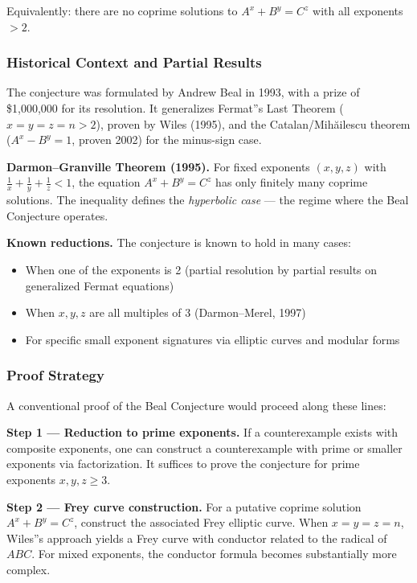 \documentclass[12pt,a4paper]{article}
\begin{document}
\begin{quote}
\end{quote}

Equivalently: there are no coprime solutions to $A^x + B^y = C^z$ with all exponents $> 2$.

\subsubsection{Historical Context and Partial Results}

The conjecture was formulated by Andrew Beal in 1993, with a prize of \$1,000,000 for its resolution. It generalizes Fermat''s Last Theorem ($x = y = z = n > 2$), proven by Wiles (1995), and the Catalan/Mihăilescu theorem ($A^x - B^y = 1$, proven 2002) for the minus-sign case.

\textbf{Darmon--Granville Theorem (1995).} For fixed exponents $(x, y, z)$ with $\frac{1}{x} + \frac{1}{y} + \frac{1}{z} < 1$, the equation $A^x + B^y = C^z$ has only finitely many coprime solutions. The inequality defines the \emph{hyperbolic case} --- the regime where the Beal Conjecture operates.

\textbf{Known reductions.} The conjecture is known to hold in many cases:

\begin{itemize}
    \item When one of the exponents is 2 (partial resolution by partial results on generalized Fermat equations)
    \item When $x, y, z$ are all multiples of 3 (Darmon--Merel, 1997)
    \item For specific small exponent signatures via elliptic curves and modular forms
\end{itemize}

\subsubsection{Proof Strategy}

A conventional proof of the Beal Conjecture would proceed along these lines:

\textbf{Step 1 --- Reduction to prime exponents.} If a counterexample exists with composite exponents, one can construct a counterexample with prime or smaller exponents via factorization. It suffices to prove the conjecture for prime exponents $x, y, z \geq 3$.

\textbf{Step 2 --- Frey curve construction.} For a putative coprime solution $A^x + B^y = C^z$, construct the associated Frey elliptic curve. When $x = y = z = n$, Wiles''s approach yields a Frey curve with conductor related to the radical of $ABC$. For mixed exponents, the conductor formula becomes substantially more complex.
\end{document}
